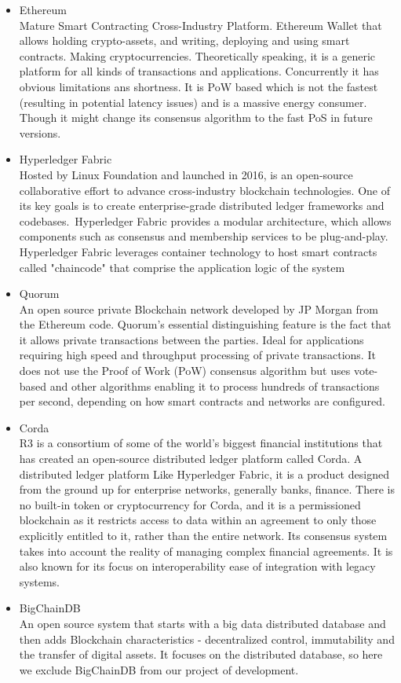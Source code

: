 \begin{itemize}
	\item Ethereum \\
	Mature Smart Contracting Cross-Industry Platform. Ethereum Wallet that allows holding crypto-assets, and writing, deploying and using smart contracts. Making cryptocurrencies. Theoretically speaking, it is a generic platform for all kinds of transactions and applications. Concurrently it has obvious limitations ans shortness. It is PoW based which is not the fastest (resulting in potential latency issues) and is a massive energy consumer. Though it might change its consensus algorithm to the fast PoS in future versions.
	\item Hyperledger Fabric\\
	Hosted by Linux Foundation and launched in 2016, is an open-source collaborative effort to advance cross-industry blockchain technologies. One of its key goals is to create enterprise-grade distributed ledger frameworks and codebases. Hyperledger Fabric provides a modular architecture, which allows components 
	such as consensus and membership services to be plug-and-play. Hyperledger Fabric 
	leverages container technology to host smart contracts called "chaincode" that comprise 
	the application logic of the system
	\item Quorum\\
	An open source private Blockchain network developed by JP Morgan from the 
	Ethereum code. Quorum’s essential distinguishing feature is the fact that it allows private transactions between the parties. Ideal for applications requiring high speed and throughput processing of private transactions.  It does not use the Proof of Work (PoW) consensus algorithm but uses vote-based and other algorithms enabling it to process hundreds of transactions per second, depending on how smart contracts and networks are configured. 
	\item Corda\\
	R3 is a consortium of some of the world's biggest financial institutions that has created an open-source distributed ledger platform called Corda. A distributed ledger platform Like Hyperledger Fabric, it is a product designed from the ground up for enterprise networks, generally banks, finance. There is no built-in token or cryptocurrency for Corda, and it is a permissioned blockchain as it restricts access to data within an agreement to only those explicitly entitled to it, rather than the entire network. Its consensus system takes into account the reality of managing complex financial agreements. It is also known for its focus on interoperability ease of integration with legacy systems.  
	\item BigChainDB\\
	An open source system
	 that starts with a big data distributed database and then adds Blockchain characteristics - decentralized control, immutability and the transfer of digital assets. It focuses on the distributed database, so here we exclude BigChainDB from our project of development.
\end{itemize}
